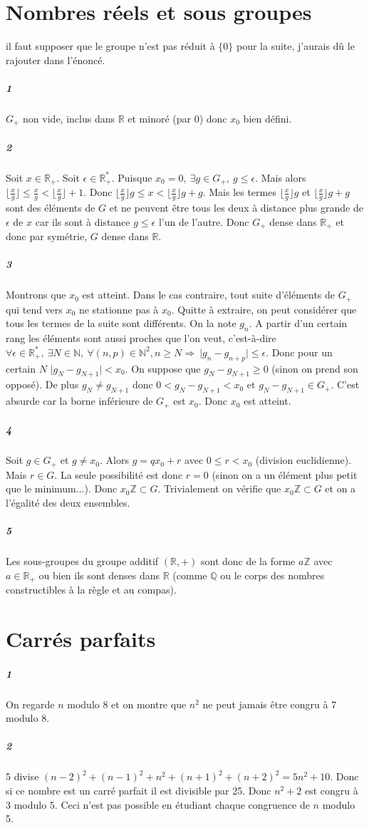 \documentclass[10pt,a4paper]{article}
\begin{document}
\section{Nombres réels et sous groupes}
\danger il faut supposer que le groupe n'est pas réduit à $\lbrace 0 \rbrace$ pour la suite, j'aurais dû le rajouter dans l'énoncé.
\subparagraph{1}$G_+$ non vide, inclus dans $\mathbb{R}$ et minoré (par 0) donc $x_0$ bien défini.
\subparagraph{2}Soit $x \in \mathbb{R}_+$. Soit $\epsilon \in \mathbb{R}_+^*$. Puisque $x_0=0, \ \exists g \in G_+, \ g \le \epsilon$. Mais alors $\lfloor \frac{x}{g} \rfloor \le \frac{x}{g} < \lfloor \frac{x}{g} \rfloor +1$. Donc $\lfloor \frac{x}{g} \rfloor g \le x < \lfloor \frac{x}{g} \rfloor g +g$. Mais les termes $\lfloor \frac{x}{g} \rfloor g$ et $\lfloor \frac{x}{g} \rfloor g +g$ sont des éléments de $G$ et ne peuvent être tous les deux à distance plus grande de $\epsilon$ de $x$ car ils sont à distance $g \le \epsilon$ l'un de l'autre. Donc $G_+$ dense dans $\mathbb{R}_+$ et donc par symétrie, $G$ dense dans $\mathbb{R}$.
\subparagraph{3}Montrons que $x_0$ est atteint. Dans le cas contraire, tout suite d'éléments de $G_+$ qui tend vers $x_0$ ne stationne pas à $x_0$. Quitte à extraire, on peut considérer que tous les termes de la suite sont différents. On la note $g_n$. A partir d'un certain rang les éléments sont aussi proches que l'on veut, c'est-à-dire $\forall \epsilon \in \mathbb{R}_+^*, \ \exists N \in \mathbb{N}, \ \forall (n,p) \in \mathbb{N}^2, n\ge N \Rightarrow \ \vert g_n-g_{n+p} \vert \le \epsilon$. Donc pour un certain $N$ $ \vert g_N-g_{N+1} \vert < x_0$. On suppose que $g_N-g_{N+1} \ge 0$ (sinon on prend son opposé). De plus $g_N \neq g_{N+1}$ donc $0 < g_N - g_{N+1} < x_0$ et $g_N-g_{N+1} \in G_+$. C'est absurde car la borne inférieure de $G_+$ est $x_0$. Donc $x_0$ est atteint.
\subparagraph{4}Soit $g \in G_+$ et $g \neq x_0$. Alors $g=qx_0+r$ avec $0 \le r < x_0$ (division euclidienne). Mais $r \in G$. La seule possibilité est donc $r=0$ (sinon on a un élément plus petit que le minimum...). Donc $x_0\mathbb{Z} \subset G$. Trivialement on vérifie que $x_0 \mathbb{Z} \subset G$ et on a l'égalité des deux ensembles.
\subparagraph{5}Les sous-groupes du groupe additif $(\mathbb{R},+)$ sont donc de la forme $a\mathbb{Z}$ avec $a \in \mathbb{R}_+$ ou bien ils sont denses dans $\mathbb{R}$ (comme $\mathbb{Q}$ ou le corps des nombres constructibles à la règle et au compas).
\section{Carrés parfaits}
\subparagraph{1}On regarde $n$ modulo 8 et on montre que $n^2$ ne peut jamais être congru à $7$ modulo 8.
\subparagraph{2}5 divise $(n-2)^2+(n-1)^2+n^2+(n+1)^2+(n+2)^2=5n^2+10$. Donc si ce nombre est un carré parfait il est divisible par 25. Donc $n^2+2$ est congru à 3 modulo 5. Ceci n'est pas possible en étudiant chaque congruence de $n$ modulo 5.
\end{document}
